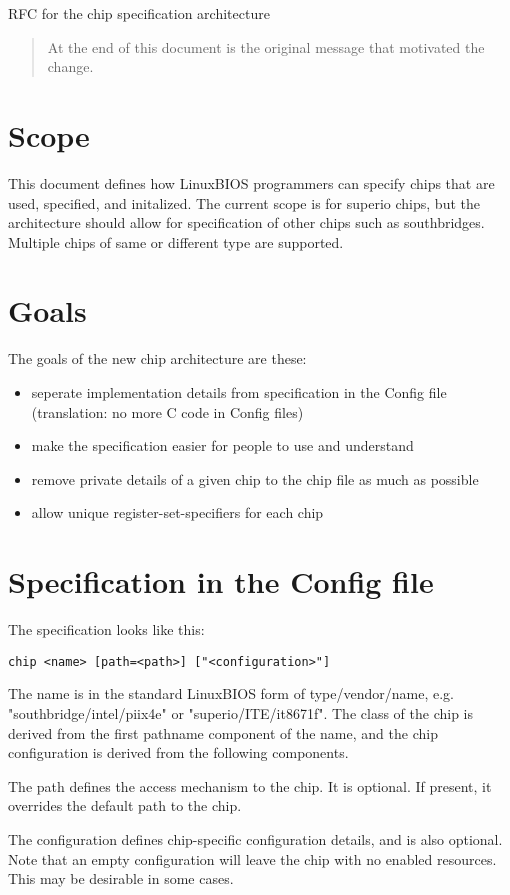 		RFC for the chip specification architecture

\begin{abstract}
At the end of this document is the original message that motivated the
change. 
\end{abstract}

\section{Scope}
This document defines how LinuxBIOS programmers can specify chips that
are used, specified, and initalized. The current scope is for superio 
chips, but the architecture should allow for specification of other chips such 
as southbridges. Multiple chips of same or different type are supported. 

\section{Goals}
The goals of the new chip architecture are these: 
\begin{itemize}
\item seperate implementation details from specification in the Config file
(translation: no more C code in Config files)
\item make the specification easier for people to use and understand
\item remove private details of a given chip to the chip file as much
as possible
\item allow unique register-set-specifiers for each chip
\end{itemize}

\section{Specification in the Config file}
The specification looks like this:
\begin{verbatim}
chip <name> [path=<path>] ["<configuration>"]
\end{verbatim}
The name is in the standard LinuxBIOS form of type/vendor/name, e.g. 
"southbridge/intel/piix4e" or "superio/ITE/it8671f". The class of the 
chip is derived from the first pathname component of the name, and the chip 
configuration is derived from the following components. 

The path defines the access mechanism to the chip. 
It is optional. If present, it overrides the default path to the chip. 

The configuration defines chip-specific configuration details, and is also
optional. Note that an empty configuration will leave the chip with 
no enabled resources. This may be desirable in some cases. 


